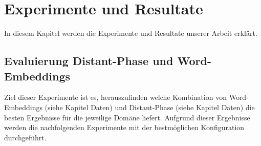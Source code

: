 \chapter{Experimente und Resultate}
In diesem Kapitel werden die Experimente und Resultate unserer Arbeit erklärt.
\section{Evaluierung Distant-Phase und Word-Embeddings}
Ziel dieser Experimente ist es, herauszufinden welche Kombination von Word-Embeddings (siehe Kapitel Daten) und Distant-Phase (siehe Kapitel Daten) die besten Ergebnisse für die jeweilige Domäne liefert. Aufgrund dieser Ergebnisse werden die nachfolgenden Experimente mit der bestmöglichen Konfiguration durchgeführt.
